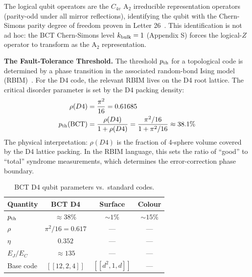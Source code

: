 \documentclass[aps,prl,twocolumn,superscriptaddress,floatfix]{revtex4-2}
\begin{document}
The logical qubit operators are the $C_{4v}$ A$_2$ irreducible representation
operators (parity-odd under all mirror reflections), identifying the qubit
with the Chern-Simons parity degree of freedom proven in Letter 26~\cite{L26}.
This identification is not ad hoc: the BCT Chern-Simons level
$k_{\rm bulk} = 1$ (Appendix S) forces the logical-$Z$ operator to transform
as the A$_2$ representation.

\medskip
\noindent\textbf{The Fault-Tolerance Threshold.}
The threshold $p_{\rm th}$ for a topological code is determined by a
phase transition in the associated random-bond Ising model (RBIM)~\cite{Dennis2002}.
For the D4 code, the relevant RBIM lives on the D4 root lattice.
The critical disorder parameter is set by the D4 packing density:
\begin{align}
  \rho(D4) &= \frac{\pi^2}{16} = 0.61685 \label{eq:rhoD4}\\
  p_{\rm th}({\rm BCT}) &= \frac{\rho(D4)}{1 + \rho(D4)}
    = \frac{\pi^2/16}{1 + \pi^2/16} \approx 38.1\%
  \label{eq:pth}
\end{align}
The physical interpretation: $\rho(D4)$ is the fraction of 4-sphere volume
covered by the D4 lattice packing. In the RBIM language, this sets the
ratio of ``good'' to ``total'' syndrome measurements, which determines the
error-correction phase boundary.

\begin{table}[h]
\centering
\caption{BCT D4 qubit parameters vs.\ standard codes.}
\label{tab:qubit}
\begin{tabular}{lccc}
\toprule
Quantity & BCT D4 & Surface & Colour \\
\midrule
$p_{\rm th}$ & $\approx 38\%$ & $\sim 1\%$ & $\sim 15\%$ \\
$\rho$ & $\pi^2/16 = 0.617$ & — & — \\
$\eta$ & $0.352$ & — & — \\
$E_J/E_C$ & $\approx 135$ & — & — \\
Base code & $[[12,2,4]]$ & $[[d^2,1,d]]$ & — \\
\bottomrule
\end{tabular}
\end{table}
\end{document}
